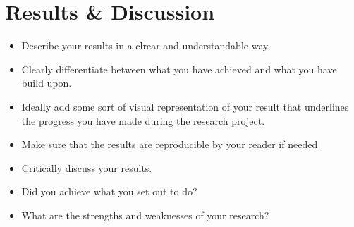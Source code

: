 \section{Results \& Discussion}

\begin{itemize}
	\item Describe your results in a clrear and understandable way.
	\item Clearly differentiate between what you have achieved and what you have build upon.
	\item Ideally add some sort of visual representation of your result that underlines the progress you have made during the research project.
	\item Make sure that the results are reproducible by your reader if needed
	\item Critically discuss your results.
	\item Did you achieve what you set out to do?
	\item What are the strengths and weaknesses of your research?
\end{itemize}
